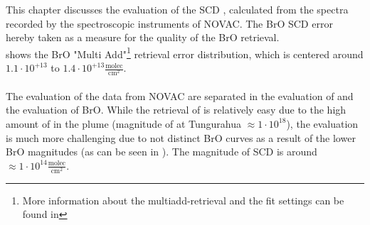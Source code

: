 This chapter discusses the evaluation of the  SCD , calculated from the spectra recorded by the spectroscopic instruments of NOVAC. The BrO SCD error hereby taken as a measure for the quality of the BrO retrieval.\\
 shows the BrO "Multi Add"\footnote{More information about the multiadd-retrieval and the fit settings can be found in } retrieval error distribution, which is centered around $1.1\cdot10^{+13}$ to $1.4\cdot 10^{+13}\frac{\text{molec}}{\text{cm}^2}$. \\
\\
The evaluation of the data from NOVAC are separated in the evaluation of  and the evaluation of BrO. While the retrieval of  is relatively easy due to the high amount of  in the plume (magnitude of  at Tungurahua $\approx 1\cdot 10^{18}$), the  evaluation is much more challenging due to not distinct BrO curves as a result of the lower BrO magnitudes (as can be seen in ). The magnitude of  SCD is around $\approx 1\cdot 10^{14}\frac{\text{molec}}{\text{cm}^2}$. \\
%

